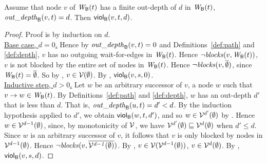 \begin{proposition} \label{prop:outdepth-finite-implies-scViol}
Assume that node $v$ of $\wfg{\B}{t}$ has a finite out-depth of $d$ in $\wfg{\B}{t}$, \ie 
$\wodepth{\B}{v}{t} = d$. Then $\viol{v}{d}{t}$.  %
\end{proposition}
%
\begin{proof}
Proof is by induction on $d$.\\

\noindent
\ul{Base case, $d=0$.} Hence by $\wodepth{\B}{v}{t} = 0$ and Definitions~\ref{def:path} and \ref{def:depth},  
$v$ has no outgoing wait-for-edges in $\wfg{\B}{t}$. Hence $\neg \blocks{v}{\wfg{\B}{t}}$, \ie $v$ is not blocked by the entire set of nodes in 
$\wfg{\B}{t}$. Hence $\neg \blocks{v}{\compl{\ewfg}}$, since $\wfg{\B}{t} = \compl{\ewfg}$. So by , 
$v \in \VF{\ewfg}$. By , $\scVd{v}{0}{s}$.\\


\noindent
\ul{Inductive step, $d > 0$.}
Let $w$ be an arbitrary successor of $v$, \ie a node $w$ such that $v \ar w \in \wfg{\B}{t}$.
By Definitions~\ref{def:path} and \ref{def:depth}, $w$ has an out-depth $d'$ that is less than $d$. 
That is, $\wodepth{\B}{u}{t} = d' < d$.
By the induction hypothesis applied to $d'$, we obtain $\viol{w}{d'}{t}$, and so $w \in \VFs^{d'} (\ewfg)$ by .
Hence $w \in \VFs^{d-1} (\ewfg)$, since, by monotonicity of $\VFs$, we have $\VFs^{d'}(\ewfg) \subg \VFs^{d}(\ewfg)$ when $d' \le d$.
Since  $w$ is an arbitrary successor of $v$, it follows that $v$ is only blocked by nodes in $\VFs^{d-1} (\ewfg)$.
Hence $\neg \blocks{v}{\compl{\VFs^{d-1} (\ewfg)}}$. 
By , $v \in \VF{\VFs^{d-1} (\ewfg)}$, \ie $v \in \VFs^{d} (\ewfg)$.
By , $\scVd{v}{d}{s}$.
\end{proof}








